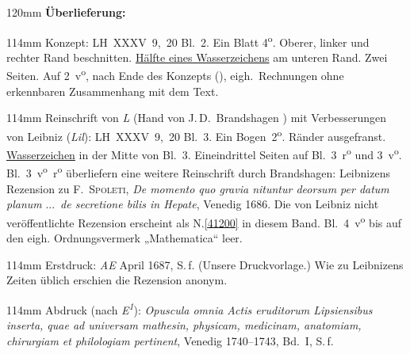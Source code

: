 \begin{ledgroupsized}[r]{120mm}
\footnotesize
\pstart
\noindent\textbf{Überlieferung:}
\pend
\end{ledgroupsized}
\begin{ledgroupsized}[r]{114mm}
\footnotesize
\pstart \parindent -6mm
%
Konzept:
LH~XXXV~9,~20 Bl.~2.
Ein Blatt 4\textsuperscript{o}.
Oberer, linker und rechter Rand beschnitten.
\href{\Scan{LH_35_09_20_002wz}}%
{Hälfte eines Wasserzeichens} 
am unteren Rand.
Zwei Seiten.
Auf 2~v\textsuperscript{o}, nach Ende des Konzepts (), eigh.\ Rechnungen ohne erkennbaren Zusammenhang mit dem Text.
\pend
\end{ledgroupsized}
\begin{ledgroupsized}[r]{114mm}
\footnotesize
\pstart \parindent -6mm
%
Reinschrift von \textit{L} (Hand von J.\,D.~Brandshagen%
) %
mit Verbesserungen von Leibniz (\textit{Lil}):
LH~XXXV~9,~20 Bl.~3.
Ein Bogen~2\textsuperscript{o}.
Ränder ausgefranst.
\href{\Scan{LH_35_09_20_003wz}}%
{Wasserzeichen} in der Mitte von Bl.~3.
Eineindrittel Seiten auf Bl.~3~r\textsuperscript{o} und 3~v\textsuperscript{o}.
Bl.~3~v\textsuperscript{o}~r\textsuperscript{o} überliefern eine weitere Reinschrift durch Brandshagen: 
Leibnizens Rezension zu
\textsc{F.~Spoleti},
\cite{02095}\textit{De momento quo gravia nituntur deorsum per datum planum} \lbrack...\rbrack\ \textit{de secretione bilis in Hepate}, Venedig 1686. Die von Leibniz nicht veröffentlichte Rezension erscheint als N.\;\ref{41200} in diesem Band.
Bl.~4~v\textsuperscript{o} bis auf den eigh. Ordnungsvermerk „Mathematica“ leer.
\pend
\end{ledgroupsized}
\begin{ledgroupsized}[r]{114mm}
\footnotesize
\pstart
\parindent -6mm
%
Erstdruck:
\cite{01023}\textit{AE} April 1687, S.\,f.
(Unsere Druckvorlage.) Wie zu Leibnizens Zeiten üblich erschien die Rezension anonym.
\pend
\end{ledgroupsized}
\begin{ledgroupsized}[r]{114mm}
\footnotesize
\pstart
\parindent -6mm
%
Abdruck (nach \textit{E\textsuperscript{1}}): 
\cite{01421}\textit{Opuscula omnia Actis eruditorum Lipsiensibus inserta, quae ad universam mathesin, physicam, medicinam, anatomiam, chirurgiam et philologiam pertinent}, Venedig 1740--1743,  Bd.~I, S.\,f.
\pend%
\end{ledgroupsized}
